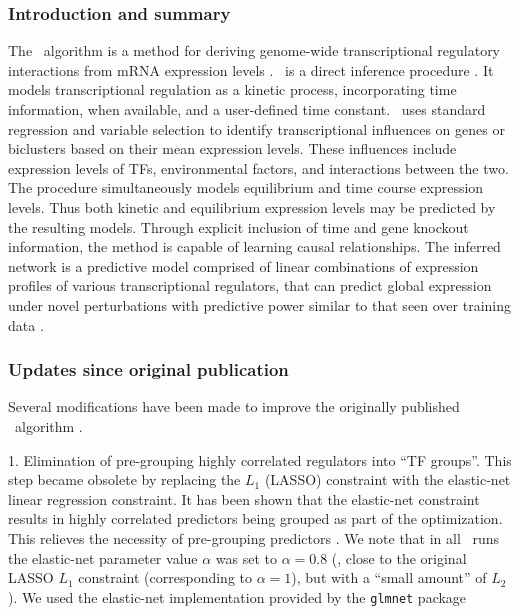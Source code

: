 \subsubsection{Introduction and summary}

The \nwinf\ algorithm is a method for deriving genome-wide
transcriptional regulatory interactions from mRNA expression
levels \cite{Bonneau2006}. \nwinf\ is a direct inference
procedure \cite{Michoel2009}. It models transcriptional regulation as
a kinetic process, incorporating time information, when available, and
a user-defined time constant. \nwinf\ uses standard regression and
variable selection to identify transcriptional influences on genes or
biclusters based on their mean expression levels. These influences
include expression levels of TFs, environmental factors, and
interactions between the two. The procedure simultaneously models
equilibrium and time course expression levels. Thus both kinetic and
equilibrium expression levels may be predicted by the resulting
models. Through explicit inclusion of time and gene knockout
information, the method is capable of learning causal
relationships. The inferred network is a predictive model comprised of
linear combinations of expression profiles of various transcriptional
regulators, that can predict global expression under novel
perturbations with predictive power similar to that seen over training
data \cite{Bonneau2006}.

\subsubsection{Updates since original publication}

Several modifications have been made to improve the originally
published \nwinf\ algorithm \cite{Bonneau2006}.

1. Elimination of pre-grouping highly correlated regulators
into ``TF groups''. This step became obsolete
by replacing the $L_1$ (LASSO) constraint with the elastic-net
linear regression constraint. It has been shown that the elastic-net
constraint results in highly correlated predictors being grouped as
part of the optimization. This relieves the necessity of pre-grouping
predictors \cite{Zou05regularizationand}. We note that in
all \nwinf\ runs the elastic-net parameter value $\alpha$ was set to
$\alpha=0.8$ (\ie, close to the original LASSO $L_1$ constraint
(corresponding to $\alpha=1$), but with a ``small amount'' of
$L_2$). We used the elastic-net implementation provided by
the  \texttt{glmnet}
package \cite{Friedman:Hastie:Tibshirani:2009:JSSOBK:v33i01}


